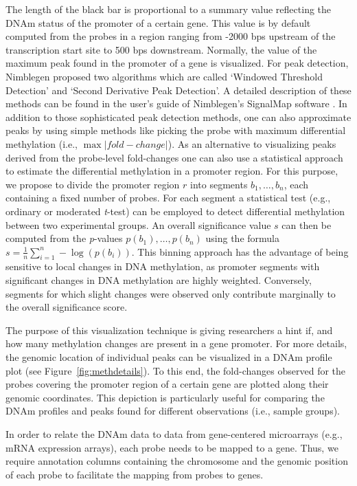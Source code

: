 \documentclass{bioinfo}
\begin{document}
The length of the black bar is proportional to a summary value reflecting the DNAm status of the
promoter of a certain gene. This value is by default computed from the probes in a region ranging
from -2000 bps upstream of the transcription start site to 500 bps downstream. Normally, the
value of the maximum peak found in the promoter of a gene is visualized. For peak detection,
Nimblegen proposed two algorithms which are called `Windowed Threshold Detection' and
`Second Derivative Peak Detection'. A detailed description of these methods can be found in the
user's guide of Nimblegen's SignalMap software \citep[see][]{NimblegenSignalMapUserGuide}.
In addition to those sophisticated peak detection methods, one can also approximate peaks by
using simple methods like picking the probe with maximum differential methylation (i.e., $\max|fold-change|$).
As an alternative to visualizing peaks derived from the probe-level fold-changes one can also use a statistical
approach to estimate the differential methylation in a promoter region. For this purpose, we
propose to divide the promoter region $r$ into segments $b_1,\dots,b_n$, each containing a fixed number of probes.
For each segment a statistical test (e.g., ordinary or moderated \emph{t}-test) can be employed to detect
differential methylation between two experimental groups. An overall significance value $s$ can then be computed
from the \emph{p}-values $p(b_1),\dots,p(b_n)$ using the formula $s=\frac{1}{n}\sum\limits_{i=1}^n-\log(p(b_i))$.
This binning approach has the advantage of being sensitive to local changes in DNA methylation, as promoter segments with
significant changes in DNA methylation are highly weighted. Conversely, segments for which slight changes were observed only
contribute marginally to the overall significance score.

The purpose of this visualization technique is giving researchers a hint if,
and how many methylation changes are present in a gene promoter.
For more details, the genomic location of individual peaks can be visualized in a DNAm profile plot
(see Figure~\ref{fig:methdetails}). To this end, the fold-changes observed for the probes
covering the promoter region of a certain gene are plotted along their genomic coordinates. This
depiction is particularly useful for comparing the DNAm profiles and peaks found for different
observations (i.e., sample groups).

In order to relate the DNAm data to data from gene-centered microarrays (e.g., mRNA expression
arrays), each probe needs to be mapped to a gene. Thus, we require annotation columns containing the
chromosome and the genomic position of each probe to facilitate the mapping from probes to genes.
\end{document}
